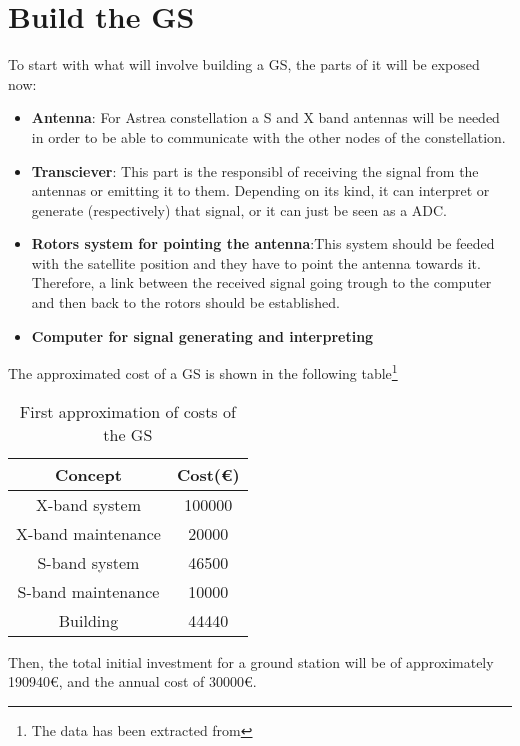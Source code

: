 \section{Build the GS}
To start with what will involve building a GS, the parts of it will be exposed now:
\begin{itemize}
\item \textbf{Antenna}: For Astrea constellation a S and X band antennas will be needed in order to be able to communicate with the other nodes of the constellation.
\item \textbf{Transciever}: This part is the responsibl of receiving the signal from the antennas or emitting it to them. Depending on its kind, it can interpret or generate (respectively) that signal, or it can just be seen as a ADC. \item \textbf{Rotors system for pointing the antenna}:This system should be feeded with the satellite position and they have to point the antenna towards it. Therefore, a link between the received signal going trough to the computer and then back to the rotors should be established. 
\item \textbf{Computer for signal generating and interpreting}
\end{itemize}
The approximated cost of a GS is shown in the following table\footnote{The data has been extracted from\cite{dartcom}\cite{isis} }
\begin{table}[H]
\begin{center}
\begin{tabular}{|c|c|}
\hline
\textbf{Concept}&\textbf{Cost(\euro)}\\
\hline
X-band system&100000\\
\hline
X-band maintenance&20000\\
\hline
S-band system&46500\\
\hline
S-band maintenance&10000\\
\hline
Building&44440\\
\hline
\end{tabular}
\caption{First approximation of costs of the GS}
\end{center}
\end{table}
Then, the total initial investment for a ground station will be of approximately 190940\euro, and the annual cost of 30000\euro. 
